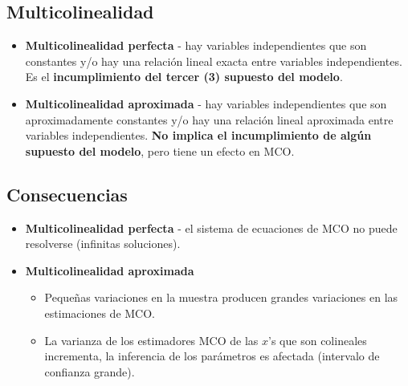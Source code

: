 \documentclass[10pt, a4paper, landscape]{extarticle}
\begin{document}
\begin{multicols}{3}
\section*{Multicolinealidad}
	\begin{itemize}[leftmargin=*]
		\item \textbf{Multicolinealidad perfecta} - hay variables independientes que son constantes y/o hay una relación lineal exacta entre variables independientes. Es el \textbf{incumplimiento del tercer (3) supuesto del modelo}.
		\item \textbf{Multicolinealidad aproximada} - hay variables independientes que son aproximadamente constantes y/o hay una relación lineal aproximada entre variables independientes. \textbf{No implica el incumplimiento de algún supuesto del modelo}, pero tiene un efecto en MCO.
	\end{itemize}
	\subsection*{Consecuencias}
		\begin{itemize}[leftmargin=*]
			\item \textbf{Multicolinealidad perfecta} - el sistema de ecuaciones de MCO no puede resolverse (infinitas soluciones).
			\item \textbf{Multicolinealidad aproximada}
			\begin{itemize}[leftmargin=*]
				\item Pequeñas variaciones en la muestra producen grandes variaciones en las estimaciones de MCO.
				\item La varianza de los estimadores MCO de las $x$'s que son colineales incrementa, la inferencia de los parámetros es afectada (intervalo de confianza grande).
			\end{itemize}
		\end{itemize}

\end{multicols}
\end{document}
